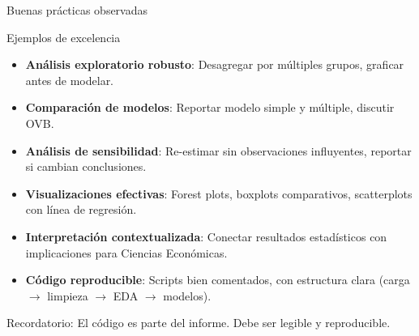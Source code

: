 \documentclass[aspectratio=169, 11pt]{beamer}
\begin{document}
\begin{frame}{Buenas prácticas observadas}
\small
\begin{exampleblock}{Ejemplos de excelencia}
\begin{itemize}\setlength{\itemsep}{1pt}
\item \textbf{An\'alisis exploratorio robusto}: Desagregar por m\'ultiples grupos, graficar antes de modelar.
\item \textbf{Comparaci\'on de modelos}: Reportar modelo simple y m\'ultiple, discutir OVB.
\item \textbf{An\'alisis de sensibilidad}: Re-estimar sin observaciones influyentes, reportar si cambian conclusiones.
\item \textbf{Visualizaciones efectivas}: Forest plots, boxplots comparativos, scatterplots con l\'inea de regresi\'on.
\item \textbf{Interpretaci\'on contextualizada}: Conectar resultados estad\'isticos con implicaciones para Ciencias Econ\'omicas.
\item \textbf{C\'odigo reproducible}: Scripts bien comentados, con estructura clara (carga $\to$ limpieza $\to$ EDA $\to$ modelos).
\end{itemize}
\end{exampleblock}

\footnotesize
\textcolor{javeriana}{Recordatorio}: El c\'odigo es parte del informe. Debe ser legible y reproducible.
\end{frame}
\end{document}
